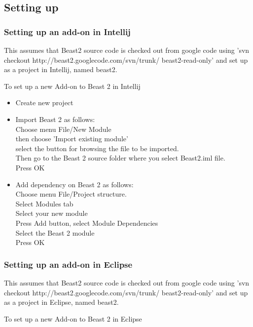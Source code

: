 \documentclass{article}
\begin{document}
\subsection{Setting up}

\subsubsection{Setting up an add-on in Intellij}

This assumes that Beast2 source code is checked out from google code
using 'svn checkout http://beast2.googlecode.com/svn/trunk/ beast2-read-only' and set up 
as a project in Intellij, named beast2.

To set up a new Add-on to Beast 2 in Intellij

\begin{itemize}
\item Create new project
\item Import Beast 2 as follows:\\
Choose menu File/New Module\\
then choose 'Import existing module'\\
select the button for browsing the file to be imported.\\
Then go to the Beast 2 source folder where you select Beast2.iml
file.\\
Press OK
\item Add dependency on Beast 2 as follows:\\
Choose menu File/Project structure.\\
Select Modules tab\\
Select your new module\\
Press Add button, select Module Dependencies\\
Select the Beast 2 module\\
Press OK
\end{itemize}

\subsubsection{Setting up an add-on in Eclipse}

This assumes that Beast2 source code is checked out from google code
using 'svn checkout http://beast2.googlecode.com/svn/trunk/ beast2-read-only' and set up 
as a project in Eclipse, named beast2.

To set up a new Add-on to Beast 2 in Eclipse
\end{document}
